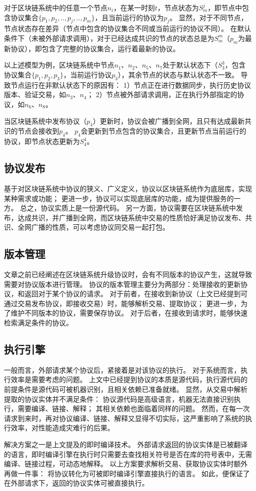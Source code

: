 对于区块链系统中的任意一个节点$n_i$，在某一时刻$t$，节点状态为$S_{m}^{j}$，即节点中包含协议集合$\{p_1,p_2,..,p_j,..,p_m\}$，且当前运行的协议为$p_j$。
显然，对于不同节点，节点状态存在差异（节点中包含的协议集合不同或当前运行的协议不同）。
在默认条件下（未被外部请求调用），对于已经达成共识的节点的状态总是为$S_{m}^{m}$（$p_m$为最新协议），即包含了完整的协议集合，运行着最新的协议。

以上述模型为例，区块链系统中节点$n_1$、$n_2$、$n_5$、$n_7$处于默认状态下（$S_{3}^{3}$，包含协议集合$\{p_1,p_2,p_3\}$，当前运行协议$p_3$），其余节点的状态与默认状态不一致。
导致节点运行在非默认状态下的原因有：
1）节点正在进行数据同步，执行历史协议版本、验证交易，如$n_3$、$n_4$；
2）节点被外部请求调用，正在执行外部指定的协议，如$n_6$、$n_8$。

当区块链系统中发布协议（$p_4$）更新时，协议会被广播到全网，且只有达成最新共识的节点会接收到$p_4$。
$p_4$会更新到节点包含的协议集合，且更新节点当前运行的协议，即节点状态更新为$S_{4}^{4}$。

\subsection{协议发布}
基于对区块链系统中协议的狭义、广义定义，协议以区块链系统作为底层库，实现某种需求或功能；
更进一步，协议可以实现底层库的功能，成为提供服务的一方。
总之，协议实质上是一份源代码。
另一方面，协议需要在区块链系统中发布，达成共识，并广播到全网，而区块链系统中交易的性质恰好满足协议发布、共识、全网广播的性质，可以考虑协议同交易一起打包。

\subsection{版本管理}
文章之前已经阐述在区块链系统升级协议时，会有不同版本的协议产生，这就导致需要对协议版本进行管理。
协议的版本管理主要分为两部分：处理接收的更新协议，和返回对于某个协议的请求。
对于前者，在接收到新协议（上文已经提到可通过交易发布协议，即接收交易）时，能够解析交易、提取协议；
更进一步，为了维护不同版本的协议，需要保存协议。
对于后者，在接收到请求时，能够快速检索满足条件的协议。

\subsection{执行引擎}
一般而言，外部请求某个协议后，紧接着是对该协议的执行。
对于系统而言，执行效率是需要考虑的问题。
上文中已经提到协议的本质是源代码，执行源代码的前提条件是源代码可被机器识别，且相关依赖已准备就绪。
显然，从交易中解析提取的协议实体并不满足条件：
协议源代码是高级语言，机器无法直接识别执行，需要编译、链接、解释；
其相关依赖也面临着同样的问题。
然而，在每一次请求到来时，再对协议编译、链接、解释又显得不切实际，这严重影响了系统的执行效率，对性能造成灾难行的后果。

解决方案之一是上文提及的即时编译技术。
外部请求返回的协议实体是已被翻译的语言，即时编译引擎在执行时只需要去查找相关符号是否在库的符号表中，无需编译、链接过程，可动态地解释。
以上方案要求解析交易、获取协议实体时额外再做一件事：
将协议转化为可被即时编译引擎直接执行的语言。
如此，便保证了在外部请求下，返回的协议实体可被直接执行。
